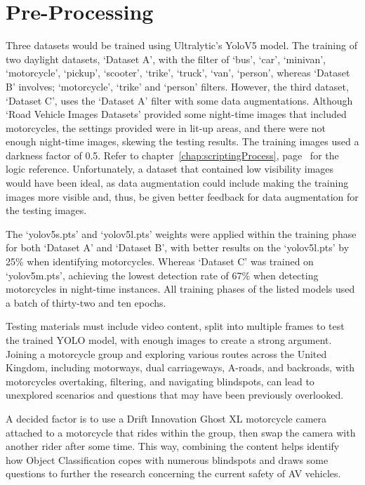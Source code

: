 \documentclass[12pt]{report} %
\begin{document}
	\section{Pre-Processing}
		Three datasets would be trained using Ultralytic's YoloV5 model. The training of two daylight datasets, `Dataset A', with the filter of `bus', `car', `minivan', `motorcycle', `pickup', `scooter', `trike', `truck', `van', `person', whereas `Dataset B' involves; `motorcycle', `trike' and `person' filters. However, the third dataset, `Dataset C', uses the `Dataset A' filter with some data augmentations. Although `Road Vehicle Images Datasets' provided some night-time images that included motorcycles, the settings provided were in lit-up areas, and there were not enough night-time images,  skewing the testing results. The training images used a darkness factor of 0.5. Refer to chapter~\ref{chap:scriptingProcess}, page~\pageref{chap:scriptingProcess} for the logic reference. Unfortunately, a dataset that contained low visibility images would have been ideal, as data augmentation could include making the training images more visible and, thus, be given better feedback for data augmentation for the testing images.
			
		The `yolov5s.pts' and `yolov5l.pts' weights were applied within the training phase for both `Dataset A' and `Dataset B', with better results on the `yolov5l.pts' by 25\% when identifying motorcycles. Whereas `Dataset C' was trained on `yolov5m.pts', achieving the lowest detection rate of 67\% when detecting motorcycles in night-time instances. All training phases of the listed models used a batch of thirty-two and ten epochs.
		
		Testing materials must include video content, split into multiple frames to test the trained YOLO model, with enough images to create a strong argument. Joining a motorcycle group and exploring various routes across the United Kingdom, including motorways, dual carriageways, A-roads, and backroads, with motorcycles overtaking, filtering, and navigating blindspots, can lead to unexplored scenarios and questions that may have been previously overlooked.
					
		A decided factor is to use a Drift Innovation Ghost XL motorcycle camera attached to a motorcycle that rides within the group, then swap the camera with another rider after some time. This way, combining the content helps identify how Object Classification copes with numerous blindspots and draws some questions to further the research concerning the current safety of AV vehicles. 
		
\end{document}
